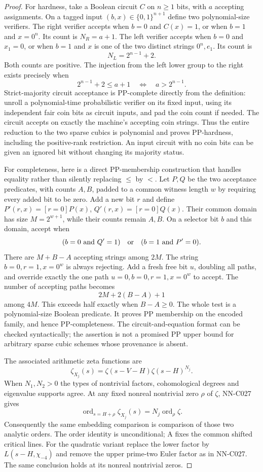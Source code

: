 \begin{proof}
For hardness, take a Boolean circuit $C$ on $n\geq1$ bits, with $a$ accepting assignments. On a tagged input $(b,x)\in\{0,1\}^{n+1}$ define two polynomial-size verifiers. The right verifier accepts when $b=0$ and $C(x)=1$, or when $b=1$ and $x=0^n$. Its count is $N_R=a+1$. The left verifier accepts when $b=0$ and $x_1=0$, or when $b=1$ and $x$ is one of the two distinct strings $0^n,e_1$. Its count is
\[
             N_L=2^{n-1}+2.
\]
Both counts are positive. The injection from the left lower group to the right exists precisely when
\[
  2^{n-1}+2\leq a+1
       \quad\Longleftrightarrow\quad a>2^{n-1}.
\]
Strict-majority circuit acceptance is PP-complete directly from the definition: unroll a polynomial-time probabilistic verifier on its fixed input, using its independent fair coin bits as circuit inputs, and pad the coin count if needed. The circuit accepts on exactly the machine's accepting coin strings. Thus the entire reduction to the two sparse cubics is polynomial and proves PP-hardness, including the positive-rank restriction. An input circuit with no coin bits can be given an ignored bit without changing its majority status.

For completeness, here is a direct PP-membership construction that handles equality rather than silently replacing $\leq$ by $<$. Let $P,Q$ be the two acceptance predicates, with counts $A,B$, padded to a common witness length $w$ by requiring every added bit to be zero. Add a new bit $r$ and define
$P'(r,x)=[r=0]P(x)$, $Q'(r,x)=[r=0]Q(x)$.
Their common domain has size $M=2^{w+1}$, while their counts remain $A,B$. On a selector bit $b$ and this domain, accept when
\[
          (b=0\ \hbox{and }Q'=1)
            \quad\hbox{or}\quad(b=1\ \hbox{and }P'=0).
\]
There are $M+B-A$ accepting strings among $2M$. The string $b=0,r=1,x=0^w$ is always rejecting. Add a fresh free bit $u$, doubling all paths, and override exactly the one path $u=0,b=0,r=1,x=0^w$ to accept. The number of accepting paths becomes
\[
                   2M+2(B-A)+1
\]
among $4M$. This exceeds half exactly when $B-A\geq0$. The whole test is a polynomial-size Boolean predicate. It proves PP membership on the encoded family, and hence PP-completeness. The circuit-and-equation format can be checked syntactically; the assertion is not a promised PP upper bound for arbitrary sparse cubic schemes whose provenance is absent.

The associated arithmetic zeta functions are
\[
             \zeta_{X_j}(s)
                 =\zeta(s-V-H)\zeta(s-H)^{N_j}.
\]
When $N_1,N_2>0$ the types of nontrivial factors, cohomological degrees and eigenvalue supports agree. At any fixed nonreal nontrivial zero $\rho$ of $\zeta$, NN-C027 gives
\[
 \operatorname{ord}_{s=H+\rho}\zeta_{X_j}(s)
                 =N_j\operatorname{ord}_\rho\zeta.
\]
Consequently the same embedding comparison is comparison of those two analytic orders. The order identity is unconditional; A fixes the common shifted critical lines. For the quadratic variant replace the lower factor by $L(s-H,\chi_{-4})$ and remove the upper prime-two Euler factor as in NN-C027. The same conclusion holds at its nonreal nontrivial zeros.


\end{proof}
